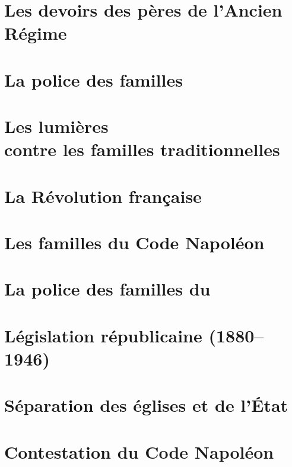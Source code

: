 \documentclass[12pt,french]{book}
\newcommand*{\crm}[1]{%
\textsc{\romannumeral #1}}  %
\newcommand*{\siecle}[1]{%
\crm{#1}%
\ifnum#1=1%
  \ifdefined\ier%
    \ier%
  \else%
    \textsuperscript{\lowercase{er}}%
  \fi%
\else%
  \ifdefined\ieme%
    \ieme%
  \else%
    \textsuperscript{\lowercase{e}}%
  \fi%
\fi%
\ siècle}
\begin{document}
\chapter{Les devoirs des pères de l'Ancien Régime}


\chapter{La police des familles}


\chapter[Les lumières contre les familles traditionnelles]{Les lumières\\contre les familles traditionnelles}


\chapter{La Révolution française}


\chapter{Les familles du Code Napoléon}


\chapter{La police des familles du }%


\chapter{Législation républicaine (1880--1946)}


\chapter{Séparation des églises et de l'État}


\chapter{Contestation du Code Napoléon}

\end{document}
